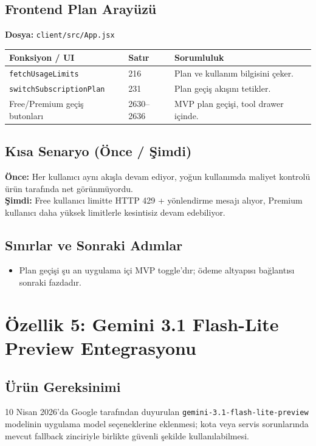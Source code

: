 \documentclass[11pt,a4paper]{article}
\begin{document}
\subsection{Frontend Plan Arayüzü}

\textbf{Dosya:} \texttt{client/src/App.jsx}

\begin{tabularx}{\textwidth}{@{} L{4.5cm} L{2.5cm} X @{}}
\toprule
\textbf{Fonksiyon / UI} & \textbf{Satır} & \textbf{Sorumluluk} \\
\midrule
\texttt{fetchUsageLimits} & 216 & Plan ve kullanım bilgisini çeker. \\
\addlinespace
\texttt{switchSubscriptionPlan} & 231 & Plan geçiş akışını tetikler. \\
\addlinespace
Free/Premium geçiş butonları & 2630--2636 & MVP plan geçişi, tool drawer içinde. \\
\bottomrule
\end{tabularx}

\subsection{Kısa Senaryo (Önce / Şimdi)}

\begin{notebox}
\textbf{Önce:} Her kullanıcı aynı akışla devam ediyor, yoğun kullanımda maliyet kontrolü ürün tarafında net görünmüyordu.\\[4pt]
\textbf{Şimdi:} Free kullanıcı limitte HTTP 429 + yönlendirme mesajı alıyor, Premium kullanıcı daha yüksek limitlerle kesintisiz devam edebiliyor.
\end{notebox}

\subsection{Sınırlar ve Sonraki Adımlar}
\begin{itemize}[leftmargin=1.5em]
  \item Plan geçişi şu an uygulama içi MVP toggle'dır; ödeme altyapısı bağlantısı sonraki fazdadır.
\end{itemize}

\section{Özellik 5: Gemini 3.1 Flash-Lite Preview Entegrasyonu}

\subsection{Ürün Gereksinimi}
10 Nisan 2026'da Google tarafından duyurulan \texttt{gemini-3.1-flash-lite-preview} modelinin uygulama model seçeneklerine eklenmesi; kota veya servis sorunlarında mevcut fallback zinciriyle birlikte güvenli şekilde kullanılabilmesi.
\end{document}
